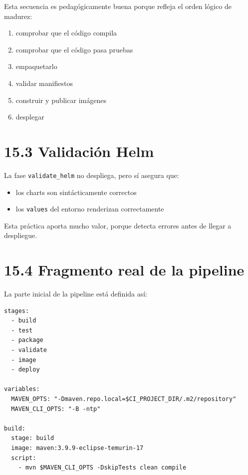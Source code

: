 \documentclass[
a4paper,
12pt]{report}
\providecommand{\tightlist}{%
  \setlength{\itemsep}{0pt}\setlength{\parskip}{0pt}}
\begin{document}
Esta secuencia es pedagógicamente buena porque refleja el orden lógico
de madurez:

\begin{enumerate}
\def\labelenumi{\arabic{enumi}.}
\tightlist
\item
  comprobar que el código compila\\
\item
  comprobar que el código pasa pruebas\\
\item
  empaquetarlo\\
\item
  validar manifiestos\\
\item
  construir y publicar imágenes\\
\item
  desplegar
\end{enumerate}

\section{15.3 Validación Helm}\label{validaciuxf3n-helm}

La fase \texttt{validate\_helm} no despliega, pero sí asegura que:

\begin{itemize}
\tightlist
\item
  los charts son sintácticamente correctos
\item
  los \texttt{values} del entorno renderizan correctamente
\end{itemize}

Esta práctica aporta mucho valor, porque detecta errores antes de llegar
a despliegue.

\section{15.4 Fragmento real de la
pipeline}\label{fragmento-real-de-la-pipeline}

La parte inicial de la pipeline está definida así:

\begin{verbatim}
stages:
  - build
  - test
  - package
  - validate
  - image
  - deploy

variables:
  MAVEN_OPTS: "-Dmaven.repo.local=$CI_PROJECT_DIR/.m2/repository"
  MAVEN_CLI_OPTS: "-B -ntp"

build:
  stage: build
  image: maven:3.9.9-eclipse-temurin-17
  script:
    - mvn $MAVEN_CLI_OPTS -DskipTests clean compile
\end{verbatim}
\end{document}
